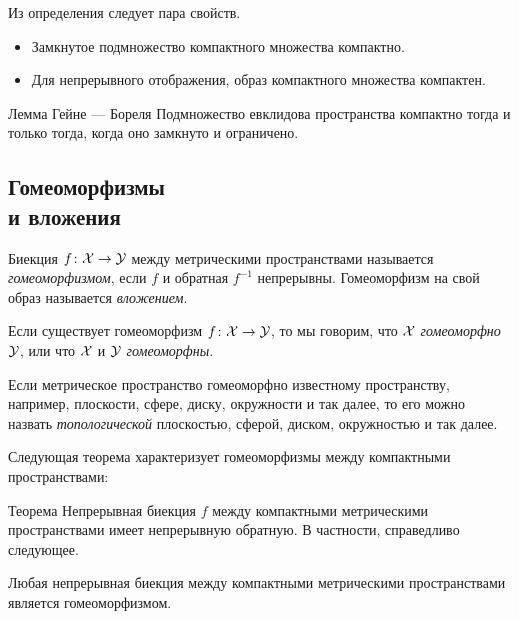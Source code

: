 \begin{multicols}{2}
{Из определения следует пара свойств.

\begin{itemize}
\item Замкнутое подмножество компактного множества компактно.
\item Для непрерывного отображения, образ компактного множества компактен.
\end{itemize}


{\sloppy

\begin{thm}{Лемма Гейне --- Бореля}\label{thm:Heine--Borel}
Подмножество евклидова пространства компактно тогда и только тогда, когда оно замкнуто и ограничено.
\end{thm}

}

\subsection*{Гомеоморфизмы\\ и вложения}

Биекция $f\colon\mathcal{X}\to\mathcal{Y}$ между метрическими пространствами называется \emph{гомеоморфизмом}, если $f$ и обратная $f^{-1}$ непрерывны.
Гомеоморфизм на свой образ называется \emph{вложением}.

Если существует гомеоморфизм $f\colon\mathcal{X}\to \mathcal{Y}$,
то мы говорим, что ${\mathcal{X}}$ {}\emph{гомеоморфно} $\mathcal{Y}$,
или что $\mathcal{X}$ и $\mathcal{Y}$ {}\emph{гомеоморфны}.

{\sloppy

Если метрическое пространство гомеоморфно известному пространству, например, плоскости, сфере, диску, окружности и так далее,
то его можно назвать \emph{топологической} плоскостью, сферой, диском, окружностью и так далее.

}

Следующая теорема характеризует гомеоморфизмы между компактными пространствами:

\begin{thm}{Теорема}\label{thm:Hausdorff-compact}
Непрерывная биекция $f$ между компактными метрическими пространствами имеет непрерывную обратную.
В частности, справедливо следующее.

\begin{subthm}{}
Любая непрерывная биекция между компактными метрическими пространствами
является гомеоморфизмом.
\end{subthm}


\end{thm}}
\end{multicols}
